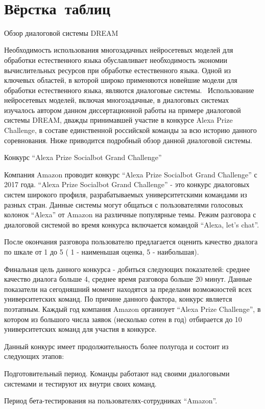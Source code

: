   \chapter{Вёрстка таблиц}\label{ch:ch3} 
  Обзор диалоговой системы DREAM

Необходимость использования многозадачных нейросетевых моделей для обработки естественного языка обуславливает необходимость экономии вычислительных ресурсов при обработке естественного языка. Одной из ключевых областей, в которой широко применяются новейшие модели для обработки естественного языка, являются диалоговые системы.  Использование нейросетевых моделей, включая многозадачные, в диалоговых системах изучалось автором данном диссертационной работы на примере диалоговой системы DREAM, дважды принимавшей участие в конкурсе Alexa Prize Challenge, в составе единственной российской команды за всю историю данного соревнования. Ниже приводится подробный обзор данной диалоговой системы.

Конкурс “Alexa Prize Socialbot Grand Challenge”

Компания Amazon проводит конкурс “Alexa Prize Socialbot Grand Challenge” с 2017 года. “Alexa Prize Socialbot Grand Challenge” - это конкурс диалоговых систем широкого профиля, разрабатываемых университетскими командами из разных стран. Данные системы могут общаться с пользователями голосовых колонок “Alexa” от Amazon на различные популярные темы. Режим разговора с диалоговой системой во время конкурса включается командой “Alexa, let’s chat”.

После окончания разговора пользователю предлагается оценить качество диалога по шкале от 1 до 5 ( 1 - наименьшая оценка, 5 - наибольшая). 

Финальная цель данного конкурса - добиться следующих показателей: среднее качество диалога больше 4, среднее время разговора больше 20 минут. Данные показатели на сегодняшний момент находятся за пределами возможностей всех университетских команд. По причине данного фактора, конкурс является поэтапным. Каждый год компания Amazon организует “Alexa Prize Challenge”, в котором из большого числа заявок (несколько сотен в год) отбирается до 10 университетских команд для участия в конкурсе.

Данный конкурс имеет продолжительность более полугода и состоит из следующих этапов:

Подготовительный период. Команды работают над своими диалоговыми системами и тестируют их внутри своих команд.

Период бета-тестирования на пользователях-сотрудниках “Amazon”. 

